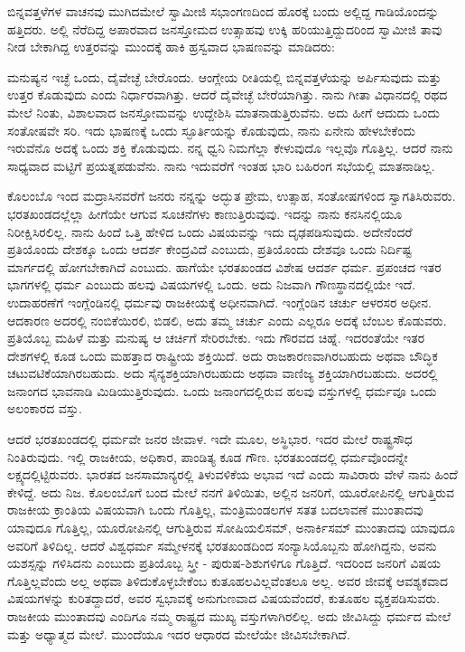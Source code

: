 ಬಿನ್ನವತ್ತಳೆಗಳ ವಾಚನವು ಮುಗಿದಮೇಲೆ ಸ್ವಾಮೀಜಿ ಸಭಾಂಗಣದಿಂದ ಹೊರಕ್ಕೆ ಬಂದು ಅಲ್ಲಿದ್ದ ಗಾಡಿಯೊಂದನ್ನು ಹತ್ತಿದರು. ಅಲ್ಲಿ ನೆರೆದಿದ್ದ ಅಪಾರವಾದ ಜನಸ್ತೋಮದ ಉತ್ಸಾಹವು ಉಕ್ಕಿ ಹರಿಯುತ್ತಿದ್ದುದರಿಂದ ಸ್ವಾಮೀಜಿ ತಾವು ನೀಡ ಬೇಕಾಗಿದ್ದ ಉತ್ತರವನ್ನು ಮುಂದಕ್ಕೆ ಹಾಕಿ ಹ್ರಸ್ವವಾದ ಭಾಷಣವನ್ನು ಮಾಡಿದರು:

ಮನುಷ್ಯನ ಇಚ್ಛೆ ಒಂದು, ದೈವೇಚ್ಛೆ ಬೇರೊಂದು. ಆಂಗ್ಲೇಯ ರೀತಿಯಲ್ಲಿ ಬಿನ್ನವತ್ತಳೆಯನ್ನು ಅರ್ಪಿಸುವುದು ಮತ್ತು ಉತ್ತರ ಕೊಡುವುದು ಎಂದು ನಿರ್ಧಾರವಾಗಿತ್ತು. ಆದರೆ ದೈವೇಚ್ಛೆ ಬೇರೆಯಾಗಿತ್ತು. ನಾನು ಗೀತಾ ವಿಧಾನದಲ್ಲಿ ರಥದ ಮೇಲೆ ನಿಂತು, ವಿಶಾಲವಾದ ಜನಸ್ತೋಮವನ್ನು ಉದ್ದೇಶಿಸಿ ಮಾತನಾಡುತ್ತಿರುವೆನು. ಅದು ಹೀಗೆ ಆದುದು ಒಂದು ಸಂತೋಷವೇ ಸರಿ. ಇದು ಭಾಷಣಕ್ಕೆ ಒಂದು ಸ್ಫೂರ್ತಿಯನ್ನು ಕೊಡುವುದು, ನಾನು ಏನೇನು ಹೇಳಬೇಕೆಂದು ಇರುವೆನೊ ಅದಕ್ಕೆ ಒಂದು ಶಕ್ತಿ ಕೊಡುವುದು. ನನ್ನ ಧ್ವನಿ ನಿಮಗೆಲ್ಲಾ ಕೇಳುವುದೊ ಇಲ್ಲವೊ ಗೊತ್ತಿಲ್ಲ. ಆದರೆ ನಾನು ಸಾಧ್ಯವಾದ ಮಟ್ಟಿಗೆ ಪ್ರಯತ್ನಪಡುವೆನು. ನಾನು ಇದುವರೆಗೆ ಇಂತಹ ಭಾರಿ ಬಹಿರಂಗ ಸಭೆಯಲ್ಲಿ ಮಾತನಾಡಿಲ್ಲ.

ಕೊಲಂಬೊ ಇಂದ ಮದ್ರಾಸಿನವರೆಗೆ ಜನರು ನನ್ನನ್ನು ಅದ್ಭುತ ಪ್ರೇಮ, ಉತ್ಸಾಹ, ಸಂತೋಷಗಳಿಂದ ಸ್ವಾಗತಿಸಿರುವರು. ಭರತಖಂಡದಲ್ಲೆಲ್ಲಾ ಹೀಗೆಯೇ ಆಗುವ ಸೂಚನೆಗಳು ಕಾಣುತ್ತಿರುವುವು. ಇದನ್ನು ನಾನು ಕನಸಿನಲ್ಲಿಯೂ ನಿರೀಕ್ಷಿಸಿರಲಿಲ್ಲ. ನಾನು ಹಿಂದೆ ಒತ್ತಿ ಹೇಳಿದ ಒಂದು ವಿಷಯವನ್ನು ಇದು ದೃಢಪಡಿಸುವುದು. ಅದೇನೆಂದರೆ ಪ್ರತಿಯೊಂದು ದೇಶಕ್ಕೂ ಒಂದು ಆದರ್ಶ ಕೇಂದ್ರವಿದೆ ಎಂಬುದು, ಪ್ರತಿಯೊಂದು ದೇಶವೂ ಒಂದು ನಿರ್ದಿಷ್ಟ ಮಾರ್ಗದಲ್ಲಿ ಹೋಗಬೇಕಾಗಿದೆ ಎಂಬುದು. ಹಾಗೆಯೇ ಭರತಖಂಡದ ವಿಶೇಷ ಆದರ್ಶ ಧರ್ಮ. ಪ್ರಪಂಚದ ಇತರ ಭಾಗಗಳಲ್ಲಿ ಧರ್ಮ ಎಂಬುದು ಹಲವು ವಿಷಯಗಳಲ್ಲಿ ಒಂದು. ಅದು ನಿಜವಾಗಿ ಗೌಣಸ್ಥಾನದಲ್ಲಿಯೇ ಇದೆ. ಉದಾಹರಣೆಗೆ ಇಂಗ್ಲೆಂಡಿನಲ್ಲಿ ಧರ್ಮವು ರಾಜಕೀಯಕ್ಕೆ ಅಧೀನವಾಗಿದೆ. ಇಂಗ್ಲೆಂಡಿನ ಚರ್ಚು ಆಳರಸರ ಅಧೀನ. ಆದಕಾರಣ ಅದರಲ್ಲಿ ನಂಬಿಕೆಯಿರಲಿ, ಬಿಡಲಿ, ಅದು ತಮ್ಮ ಚರ್ಚು ಎಂದು ಎಲ್ಲರೂ ಅದಕ್ಕೆ ಬೆಂಬಲ ಕೊಡುವರು. ಪ್ರತಿಯೊಬ್ಬ ಮಹಿಳೆ ಮತ್ತು ಮನುಷ್ಯ ಆ ಚರ್ಚಿಗೆ ಸೇರಿರಬೇಕು. ಇದು ಗೌರವದ ಚಿಹ್ನೆ. ಇದರಂತೆಯೇ ಇತರ ದೇಶಗಳಲ್ಲಿ ಕೂಡ ಒಂದು ಮಹತ್ತಾದ ರಾಷ್ಟ್ರೀಯ ಶಕ್ತಿಯಿದೆ. ಅದು ರಾಜಕಾರಣವಾಗಿರಬಹುದು ಅಥವಾ ಬೌದ್ಧಿಕ ಚಟುವಟಿಕೆಯಾಗಿರಬಹುದು. ಅದು ಸೈನ್ಯಶಕ್ತಿಯಾಗಿರಬಹುದು ಅಥವಾ ವಾಣಿಜ್ಯ ಶಕ್ತಿಯಾಗಿರಬಹುದು. ಅದರಲ್ಲಿ ಜನಾಂಗದ ಭಾವನಾಡಿ ಮಿಡಿಯುತ್ತಿರುವುದು. ಒಂದು ಜನಾಂಗದಲ್ಲಿರುವ ಹಲವು ವಸ್ತುಗಳಲ್ಲಿ ಧರ್ಮವೂ ಒಂದು ಅಲಂಕಾರದ ವಸ್ತು.

ಆದರೆ ಭರತಖಂಡದಲ್ಲಿ ಧರ್ಮವೇ ಜನರ ಜೀವಾಳ. ಇದೇ ಮೂಲ, ಅಸ್ಥಿಭಾರ. ಇದರ ಮೇಲೆ ರಾಷ್ಟ್ರಸೌಧ ನಿಂತಿರುವುದು. ಇಲ್ಲಿ ರಾಜಕೀಯ, ಅಧಿಕಾರ, ಪಾಂಡಿತ್ಯ ಕೂಡ ಗೌಣ. ಭರತಖಂಡದಲ್ಲಿ ಧರ್ಮವೊಂದನ್ನೇ ಲಕ್ಷ್ಯದಲ್ಲಿಟ್ಟಿರುವರು. ಭಾರತದ ಜನಸಾಮಾನ್ಯರಲ್ಲಿ ತಿಳುವಳಿಕೆಯ ಅಭಾವ ಇದೆ ಎಂದು ಸಾವಿರಾರು ವೇಳೆ ನಾನು ಹಿಂದೆ ಕೇಳಿದ್ದೆ. ಅದು ನಿಜ. ಕೊಲಂಬೊಗೆ ಬಂದ ಮೇಲೆ ನನಗೆ ತಿಳಿಯಿತು, ಅಲ್ಲಿನ ಜನರಿಗೆ, ಯೂರೋಪಿನಲ್ಲಿ ಆಗುತ್ತಿರುವ ರಾಜಕೀಯ ಕ್ರಾಂತಿಯ ವಿಷಯವಾಗಿ ಒಂದು ಗೊತ್ತಿಲ್ಲ, ಮಂತ್ರಿಮಂಡಲಗಳ ಸತತ ಬದಲಾವಣೆ ಮುಂತಾದವು ಯಾವುದೂ ಗೊತ್ತಿಲ್ಲ, ಯೂರೋಪಿನಲ್ಲಿ ಆಗುತ್ತಿರುವ ಸೋಷಿಯಲಿಸಮ್​, ಅನಾರ್ಕಿಸಮ್​ ಮುಂತಾದವು ಯಾವುದೂ ಅವರಿಗೆ ತಿಳಿದಿಲ್ಲ. ಆದರೆ ವಿಶ್ವಧರ್ಮ ಸಮ್ಮೇಳನಕ್ಕೆ ಭರತಖಂಡದಿಂದ ಸಂನ್ಯಾಸಿಯೊಬ್ಬನು ಹೋಗಿದ್ದನು, ಅವನು ಯಶಸ್ಸನ್ನು ಗಳಿಸಿದನು ಎಂಬುದು ಪ್ರತಿಯೊಬ್ಬ ಸ್ತ್ರೀ - ಪುರುಷ-ಶಿಶುಗಳಿಗೂ ಗೊತ್ತಿದೆ. ಇದರಿಂದ ಜನರಿಗೆ ವಿಷಯ ಗೊತ್ತಿಲ್ಲವೆಂದು ಅಲ್ಲ ಅಥವಾ ತಿಳಿದುಕೊಳ್ಳಬೇಕೆಂಬ ಕುತೂಹಲವಿಲ್ಲವೆಂತಲೂ ಅಲ್ಲ. ಅವರ ಜೀವಕ್ಕೆ ಆವಶ್ಯಕವಾದ ವಿಷಯಗಳನ್ನು ಕುರಿತದ್ದಾದರೆ, ಅವರ ಸ್ವಭಾವಕ್ಕೆ ಅನುಗುಣವಾದ ವಿಷಯವೆಂದರೆ, ಕುತೂಹಲ ವ್ಯಕ್ತಪಡಿಸುವರು. ರಾಜಕೀಯ ಮುಂತಾದವು ಎಂದಿಗೂ ನಮ್ಮ ರಾಷ್ಟ್ರದ ಮುಖ್ಯ ವಸ್ತುಗಳಾಗಿರಲಿಲ್ಲ. ಅದು ಜೀವಿಸಿದ್ದು ಧರ್ಮದ ಮೇಲೆ ಮತ್ತು ಅಧ್ಯಾತ್ಮದ ಮೇಲೆ. ಮುಂದೆಯೂ ಇದರ ಆಧಾರದ ಮೇಲೆಯೇ ಜೀವಿಸಬೇಕಾಗಿದೆ.

